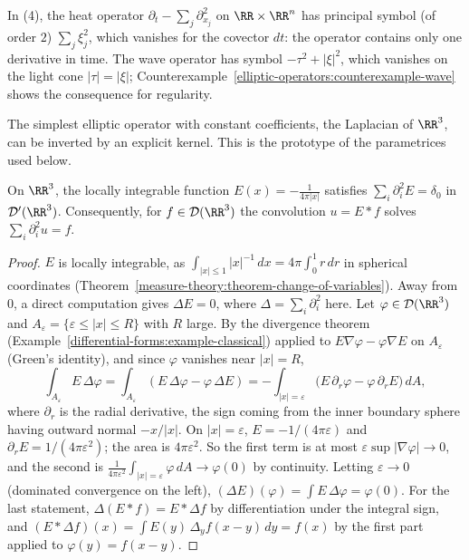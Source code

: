 In (4), the heat operator $\partial_t - \sum_j\partial_{x_j}^2$ on $\RR \times \RR^n$ has principal symbol (of order $2$) $\sum_j\xi_j^2$, which vanishes for the covector $dt$: the operator contains only one
derivative in time. The wave operator has symbol $-\tau^2 + |\xi|^2$, which vanishes on the light cone $|\tau| = |\xi|$; Counterexample~\ref{elliptic-operators:counterexample-wave} shows the consequence for
regularity.

The simplest elliptic operator with constant coefficients, the Laplacian of $\RR^3$, can be inverted by an explicit kernel. This is the prototype of the parametrices used below.

\begin{proposition}\label{elliptic-operators:proposition-fundamental-solution}
On $\RR^3$, the locally integrable function $E(x) = -\frac{1}{4\pi|x|}$ satisfies $\sum_i\partial_i^2E = \delta_0$ in $\mathcal{D}'(\RR^3)$. Consequently, for $f \in \mathcal{D}(\RR^3)$ the convolution $u = E * f$ solves $\sum_i\partial_i^2u = f$.
\end{proposition}

\begin{proof}
$E$ is locally integrable, as $\int_{|x| \leq 1}|x|^{-1}\,dx = 4\pi\int_0^1r\,dr$ in spherical coordinates (Theorem~\ref{measure-theory:theorem-change-of-variables}). Away from $0$, a direct computation gives $\Delta E = 0$, where $\Delta = \sum_i\partial_i^2$ here. Let
$\varphi \in \mathcal{D}(\RR^3)$ and $A_\varepsilon = \{\varepsilon \leq |x| \leq R\}$ with $R$ large. By the divergence theorem (Example~\ref{differential-forms:example-classical}) applied to $E\nabla\varphi - \varphi\nabla E$ on $A_\varepsilon$ (Green's
identity), and since $\varphi$ vanishes near $|x| = R$,
\[
\int_{A_\varepsilon}E\,\Delta\varphi = \int_{A_\varepsilon}(E\,\Delta\varphi - \varphi\,\Delta E) = -\int_{|x| = \varepsilon}\big(E\,\partial_r\varphi - \varphi\,\partial_rE\big)\,dA,
\]
where $\partial_r$ is the radial derivative, the sign coming from the inner boundary sphere having outward normal $-x/|x|$. On $|x| = \varepsilon$, $E = -1/(4\pi\varepsilon)$ and $\partial_rE = 1/(4\pi\varepsilon^2)$; the area is $4\pi\varepsilon^2$. So the first term is
at most $\varepsilon\sup|\nabla\varphi| \to 0$, and the second is $\frac{1}{4\pi\varepsilon^2}\int_{|x| = \varepsilon}\varphi\,dA \to \varphi(0)$ by continuity. Letting $\varepsilon \to 0$ (dominated convergence on the left),
$(\Delta E)(\varphi) = \int E\,\Delta\varphi = \varphi(0)$. For the last statement, $\Delta(E * f) = E * \Delta f$ by differentiation under the integral sign, and $(E * \Delta f)(x) = \int E(y)\,\Delta_y f(x - y)\,dy = f(x)$ by the first part applied
to $\varphi(y) = f(x - y)$.
\end{proof}

